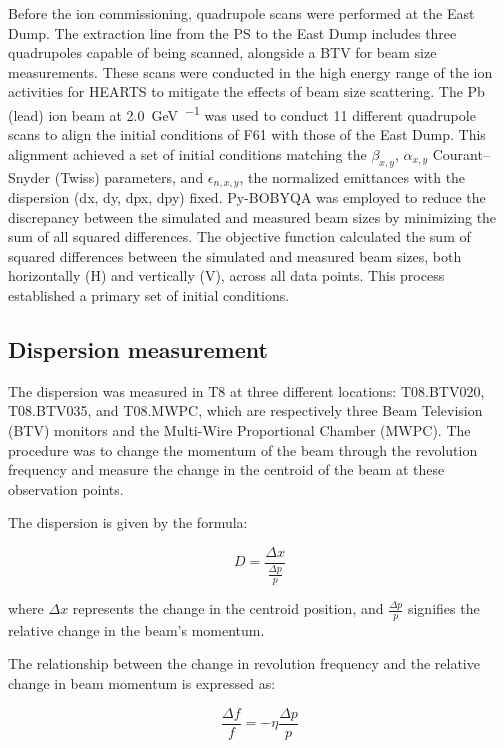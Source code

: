 \documentclass[a4paper,
               biblatex,     %
               ]{jacow}
\begin{document}
Before the ion commissioning, quadrupole scans were performed at the East Dump. The extraction line from the PS to the East Dump includes three quadrupoles capable of being scanned, alongside a BTV for beam size measurements. These scans were conducted in the high energy range of the ion activities for HEARTS to mitigate the effects of beam size scattering. The Pb (lead) ion beam at \SI{2.0}{\giga\electronvolt\per\nucleon} was used to conduct 11 different quadrupole scans to align the initial conditions of F61 with those of the East Dump. This alignment achieved a set of initial conditions matching the $\beta_{x,y}$, $\alpha_{x,y}$ Courant–Snyder (Twiss) parameters, and $\epsilon_{n,x,y}$, the normalized emittances with the dispersion (dx, dy, dpx, dpy) fixed. Py-BOBYQA \cite{cartis_escaping_2022, cartis_improving_2019} was employed to reduce the discrepancy between the simulated and measured beam sizes by minimizing the sum of all squared differences. The objective function calculated the sum of squared differences between the simulated and measured beam sizes, both horizontally (H) and vertically (V), across all data points. This process established a primary set of initial conditions.


\subsection{Dispersion measurement}

The dispersion was measured in T8 at three different locations: T08.BTV020, T08.BTV035, and T08.MWPC, which are respectively three Beam Television (BTV) monitors and the Multi-Wire Proportional Chamber (MWPC). The procedure was to change the momentum of the beam through the revolution frequency and measure the change in the centroid of the beam at these observation points.

The dispersion is given by the formula:

\begin{equation}
D = \frac{\Delta x}{\frac{\Delta p}{p}}
\end{equation}

where $\Delta x$ represents the change in the centroid position, and $\frac{\Delta p}{p}$ signifies the relative change in the beam's momentum.

The relationship between the change in revolution frequency and the relative change in beam momentum is expressed as:

\begin{equation}
\frac{\Delta f}{f} = -\eta \frac{\Delta p}{p}
\end{equation}
\end{document}
